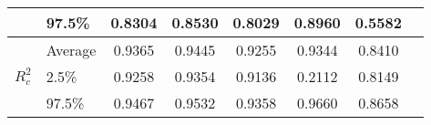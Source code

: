 \begin{table}[H]
\begin{tabular}{@{}llcccccc@{}}
                                           & 97.5\%  & 0.8304 & 0.8530 & 0.8029 & 0.8960 & 0.5582 \\ \midrule
      \multirow{3}{*}{$R^2_c$}            & Average & 0.9365 & 0.9445 & 0.9255 & 0.9344 & 0.8410 \\
                                           & 2.5\%   & 0.9258 & 0.9354 & 0.9136 & 0.2112 & 0.8149 \\
                                           & 97.5\%  & 0.9467 & 0.9532 & 0.9358 & 0.9660 & 0.8658 \\ \bottomrule
      \end{tabular}

\end{table}
